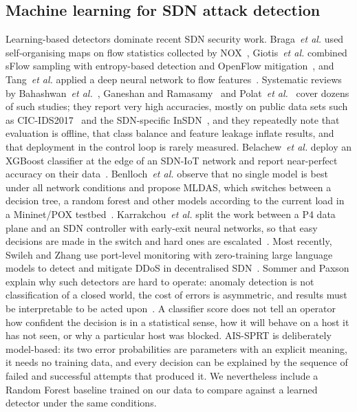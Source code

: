 \documentclass[conference]{IEEEtran}
\begin{document}
\subsection{Machine learning for SDN attack detection}
Learning-based detectors dominate recent SDN security work. Braga~\emph{et al.} used self-organising maps on flow
statistics collected by NOX~\cite{braga2010lightweight}, Giotis~\emph{et al.} combined sFlow sampling with entropy-based
detection and OpenFlow mitigation~\cite{giotis2014combining}, and Tang~\emph{et al.} applied a deep neural network to
flow features~\cite{tang2016deep}. Systematic reviews by Bahashwan~\emph{et al.}~\cite{bahashwan2023systematic}, Ganeshan
and Ramasamy~\cite{ganeshan2026systematic} and Polat~\emph{et al.}~\cite{polat2026supervised} cover dozens of such
studies; they report very high accuracies, mostly on public data sets such as CIC-IDS2017~\cite{sharafaldin2018cicids}
and the SDN-specific InSDN~\cite{elsayed2020insdn}, and they repeatedly note that evaluation is offline, that class
balance and feature leakage inflate results, and that deployment in the control loop is rarely measured. Belachew~\emph{et
al.} deploy an XGBoost classifier at the edge of an SDN-IoT network and report near-perfect accuracy on their
data~\cite{belachew2025robust}. Benlloch~\emph{et al.} observe that no single model is best under all network conditions
and propose MLDAS, which switches between a decision tree, a random forest and other models according to the current load
in a Mininet/POX testbed~\cite{benlloch2026mldas}. Karrakchou~\emph{et al.} split the work between a P4 data plane and
an SDN controller with early-exit neural networks, so that easy decisions are made in the switch and hard ones are
escalated~\cite{karrakchou2025collaborative}. Most recently, Swileh and Zhang use port-level monitoring with zero-training
large language models to detect and mitigate DDoS in decentralised SDN~\cite{swileh2025proactive}. Sommer and Paxson
explain why such detectors are hard to operate: anomaly detection is not classification of a closed world, the cost of
errors is asymmetric, and results must be interpretable to be acted upon~\cite{sommer2010closed}. A classifier score does
not tell an operator how confident the decision is in a statistical sense, how it will behave on a host it has not seen,
or why a particular host was blocked. AIS-SPRT is deliberately model-based: its two error probabilities are parameters
with an explicit meaning, it needs no training data, and every decision can be explained by the sequence of failed and
successful attempts that produced it. We nevertheless include a Random Forest baseline trained on our data to compare
against a learned detector under the same conditions.
\end{document}
